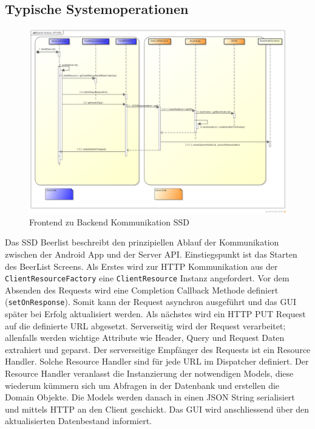 \documentclass[10pt,a4paper]{scrartcl}
\begin{document}
\subsection{Typische Systemoperationen}
\begin{figure}[H]
	\includegraphics[height=\textwidth,angle=90]{BeerlistSSD.png}
	\caption{Frontend zu Backend Kommunikation SSD}
	\label{fig:beerlist_ssd}
\end{figure}

Das SSD Beerlist beschreibt den prinzipiellen Ablauf der Kommunikation zwischen der Android App und
der Server API.  Einstiegspunkt ist das Starten des BeerList Screens. Als Erstes wird zur HTTP
Kommunikation aus der \texttt{ClientResourceFactory} eine \texttt{ClientResource} Instanz
angefordert. Vor dem Absenden des Requests wird eine Completion Callback Methode definiert
(\texttt{setOnResponse}). Somit kann der Request asynchron ausgeführt und das GUI später bei Erfolg
aktualisiert werden. Als nächstes wird ein HTTP PUT Request auf die definierte URL abgesetzt.
Serverseitig wird der Request verarbeitet; allenfalls werden wichtige Attribute wie Header, Query
und Request Daten extrahiert und geparst. Der serverseitige Empfänger des Requests ist ein Resource
Handler. Solche Resource Handler sind für jede URL im Dispatcher definiert.  Der Resource Handler
veranlasst die Instanzierung der notwendigen Models, diese wiederum kümmern sich um Abfragen in der
Datenbank und erstellen die Domain Objekte. Die Models werden danach in einen JSON String
serialisiert und mittels HTTP an den Client geschickt. Das GUI wird anschliessend über den
aktualisierten Datenbestand informiert.
\end{document}
